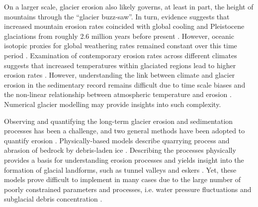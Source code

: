 \documentclass[esurf, manuscript]{copernicus}
\begin{document}
    On a larger scale, glacier erosion also likely governs, at least in part,
    the height of mountains \citep{Egholm.etal.2009,Thomson.etal.2010} through
    the ``glacier buzz-saw''. In turn, evidence suggests that increased
    mountain erosion rates coincided with global cooling and Pleistocene
    glaciations from roughly 2.6 million years before present
    \citep{Herman.Champagnac.2016}. However, oceanic isotopic proxies for
    global weathering rates remained constant over this time period
    \citep{Willenbring.Von-Blanckenburg.2010}. Examination of contemporary
    erosion rates across different climates suggests that increased temperatures
    within glaciated regions lead to higher erosion rates
    \citep{Koppes.Montgomery.2009, Koppes.etal.2015, Fernandez.etal.2016}.
    However, understanding the link
    between climate and glacier erosion in the sedimentary record remains
    difficult due to time scale biases \citep{Ganti.etal.2016} and the
    non-linear relationship between atmospheric temperature and erosion
    \citep[e.g.,][]{Anderson.etal.2012, Mariotti.etal.2021}.
    Numerical glacier modelling may provide insights into such complexity.

    Observing and quantifying the long-term glacier erosion and sedimentation
    processes has been a challenge, and two general methods have been adopted
    to quantify erosion \citep{Alley.etal.2019}. Physically-based models
    describe quarrying process and abrasion of bedrock by debris-laden ice
    \citep[e.g.,][]{Alley.etal.1997, Iverson.2012, Beaud.etal.2014}. Describing
    the processes physically provides a basis for understanding erosion
    processes \citep{Hallet.1979, Ugelvig.etal.2018} and yields insight into
    the formation of glacial landforms, such as tunnel valleys and eskers
    \citep{Beaud.etal.2018, Hewitt.Creyts.2019}. Yet, these models prove
    difficult to implement in many cases due to the large number of poorly
    constrained parameters and processes, i.e. water pressure fluctuations and
    subglacial debris concentration \citep[e.g.,][]{Hallet.1979, Seguinot.2008,
    Ugelvig.etal.2018}.
\end{document}
